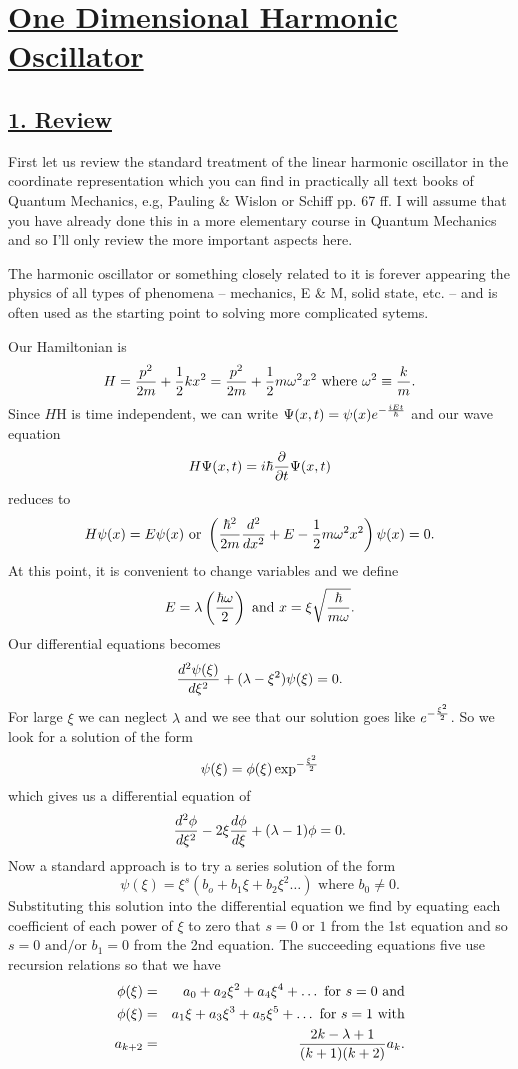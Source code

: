 \section{\underline{One Dimensional Harmonic Oscillator}}

\subsection{\underline{1. Review}}

First let us review the standard treatment of the linear harmonic oscillator in the coordinate representation which you can find in practically all text books of Quantum Mechanics, e.g, Pauling \& Wislon or Schiff pp. 67 ff. I will assume that you 
have already done this in a more elementary course in Quantum Mechanics and so I'll only review the more important aspects here. 

The harmonic oscillator or something closely related to it is forever appearing the physics of all types of phenomena -- mechanics, E \& M, solid state, etc. -- and is often used as the starting point to solving more complicated sytems. 

Our Hamiltonian is
$$H = {p^2\over 2m} + {1\over2} k x^2 = {p^2\over 2m}  + {1\over2}  m \omega^2 x^2  \mbox{   where  } \omega^2\equiv {k \over m}.$$
Since $H$H is time independent, we can write $\displaystyle \Psi(x,t) = \psi(x)e^{-{iEt\over\hbar}}$ and our wave equation 
$$H\Psi(x,t) = i\hbar{\partial \over \partial t}\Psi(x,t)$$ reduces to 
$$H\psi(x) = E \psi(x) \mbox{   or  } \left( {\hbar^2\over 2m}{d^2\over dx^2} + E - {1\over2} m \omega^2 x^2 \right)\psi(x) = 0.$$
At this point, it is convenient to change variables and we define
$$E = \lambda\left({\hbar\omega\over 2}\right) \mbox{    and    } x = \xi\sqrt{ {\hbar\over m \omega}}.$$
Our differential equations becomes
$${d^2 \psi(\xi)\over d\xi^2} + (\lambda - \xi^2)\psi(\xi) = 0.$$
For large $\xi$ we can neglect $\lambda$ and we see that our solution goes like $\displaystyle e^{-{\xi^2\over 2}}$. So we look for a solution of the form
$$\psi(\xi) = \phi(\xi)\exp^{-{\xi^2\over 2}}$$ which gives us a differential equation of 
$${d^2\phi\over d\xi^2} - 2\xi {d\phi\over d\xi} + (\lambda - 1)\phi = 0.$$
Now a standard approach is to try a series solution of the form
$$\psi(\xi) = \xi^s(b_o + b_1 \xi + b_2\xi^2 \hdots)\mbox{   where } b_0 \ne 0.$$
Substituting this solution into the differential equation we find by equating each coefficient of each power of $\xi$ to zero that $s = 0\mbox{  or } 1$ from the 1st equation and so $s=0 \mbox{ and/or } b_1 =0$ from the 2nd
equation. The succeeding equations five use recursion relations so that we have
\begin{eqnarray*}
\phi(\xi) &=& a_0 + a_2 \xi^2 + a_4 \xi^4 + \hdots \mbox{   for } s = 0  \mbox{ and}\\ 
\phi(\xi) &=& a_1\xi + a_3 \xi^3 + a_5 \xi^5 + \hdots \mbox{   for } s = 1  \mbox{ with}\\
a_{k+2} &=& {2k -\lambda + 1\over (k+1)(k+2)} a_k.
\end{eqnarray*}

